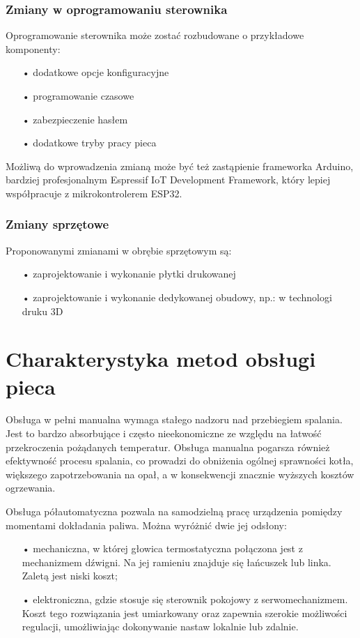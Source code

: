 \documentclass[11pt]{report}
\begin{document}
 \subsection{Zmiany w oprogramowaniu sterownika}
 Oprogramowanie sterownika może zostać rozbudowane o przykładowe komponenty:
 \begin{enumerate}
 \item[•] dodatkowe opcje konfiguracyjne
 \item[•] programowanie czasowe
 \item[•] zabezpieczenie hasłem
 \item[•] dodatkowe tryby pracy pieca
 \end{enumerate}
 Możliwą do wprowadzenia zmianą może być też zastąpienie frameworka Arduino, bardziej profesjonalnym Espressif IoT Development Framework, który lepiej współpracuje z mikrokontrolerem ESP32.
 \subsection{Zmiany sprzętowe}
 Proponowanymi zmianami w obrębie sprzętowym są:
 \begin{enumerate}
 \item[•] zaprojektowanie i wykonanie płytki drukowanej
 \item[•] zaprojektowanie i wykonanie dedykowanej obudowy, np.: w technologi druku 3D
 \end{enumerate}
 

 \chapter{Charakterystyka metod obsługi pieca}\label{ch:charakterystyka}
 Obsługa w pełni manualna wymaga stałego nadzoru nad przebiegiem spalania. Jest to bardzo absorbujące i często nieekonomiczne ze względu na łatwość przekroczenia pożądanych temperatur. Obsługa manualna pogarsza również efektywność procesu spalania, co prowadzi do obniżenia ogólnej sprawności kotła, większego zapotrzebowania na opał, a w konsekwencji znacznie wyższych kosztów ogrzewania.
 
 Obsługa półautomatyczna pozwala na samodzielną pracę urządzenia pomiędzy momentami dokładania paliwa. Można wyróżnić dwie jej odsłony:
 \begin{enumerate}
 \item[•] mechaniczna, w której głowica termostatyczna połączona jest z mechanizmem dźwigni. Na jej ramieniu znajduje się łańcuszek lub linka. Zaletą jest niski koszt;
 \item[•] elektroniczna, gdzie stosuje się sterownik pokojowy z serwomechanizmem. Koszt tego rozwiązania jest umiarkowany oraz zapewnia szerokie możliwości regulacji, umożliwiając dokonywanie nastaw lokalnie lub zdalnie. 
\end{enumerate}
 
\end{document}

